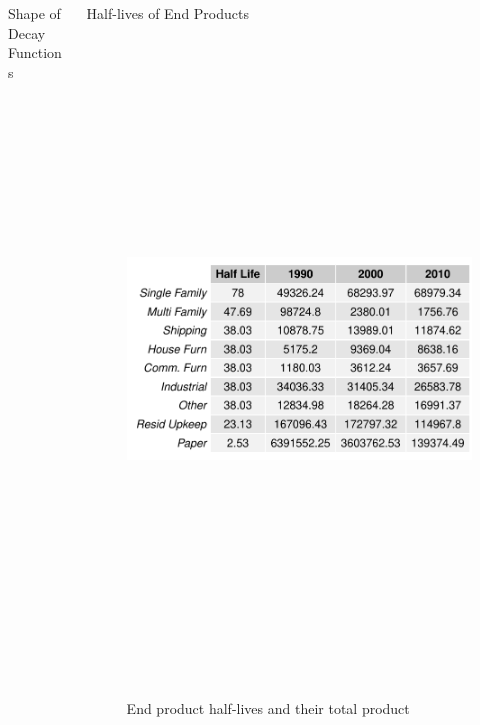 \documentclass[final]{beamer}\usepackage[]{graphicx}\usepackage[]{color}
\newlength{\onecolwid}
\newlength{\twocolwid}
\begin{document}
\begin{frame}[t]
\begin{columns}[t]
\begin{column}{\twocolwid}
\begin{columns}[t,totalwidth=\twocolwid]
\begin{column}{\onecolwid}
\begin{block}{Shape of Decay Functions}
\end{block}



\end{column} %

\begin{column}{\onecolwid} %





\begin{block}{Half-lives of End Products}
\begin{center}
\begin{figure}
{\includegraphics[width=1\linewidth, height=17cm]{CopyOfHLTable.pdf}}
      \caption{End product half-lives and their total product}
  \end{figure}
  \end{center}
  \end{block}


\end{column}
\end{columns}
\end{column}
\end{columns}
\end{frame}
\end{document}
